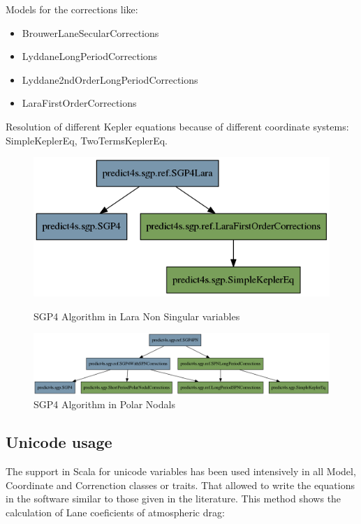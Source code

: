 \documentclass{article}
\begin{document}
Models for the corrections like:
\begin{itemize}
\item BrouwerLaneSecularCorrections
\item LyddaneLongPeriodCorrections
\item Lyddane2ndOrderLongPeriodCorrections
\item LaraFirstOrderCorrections
\end{itemize}

Resolution of different Kepler equations because of
different coordinate systems: SimpleKeplerEq, TwoTermsKeplerEq.

\begin{figure}[htb]
  \centering
	\includegraphics[width=\linewidth]{lara.png}
\label{fig:res}
\caption{SGP4 Algorithm in Lara Non Singular variables}
\end{figure}

\begin{figure}[htb]
  \centering
	\includegraphics[width=\linewidth]{pn.png}
\caption{SGP4 Algorithm in Polar Nodals}
\end{figure}

\subsection{Unicode usage}
\label{sec:unicodeusage}

The support in Scala for unicode variables has been used intensively in all Model,
Coordinate and Correnction classes or traits. That allowed to write
the equations in the software similar to those given in the literature.
This method shows the calculation of Lane coeficients of atmospheric drag:
\end{document}
